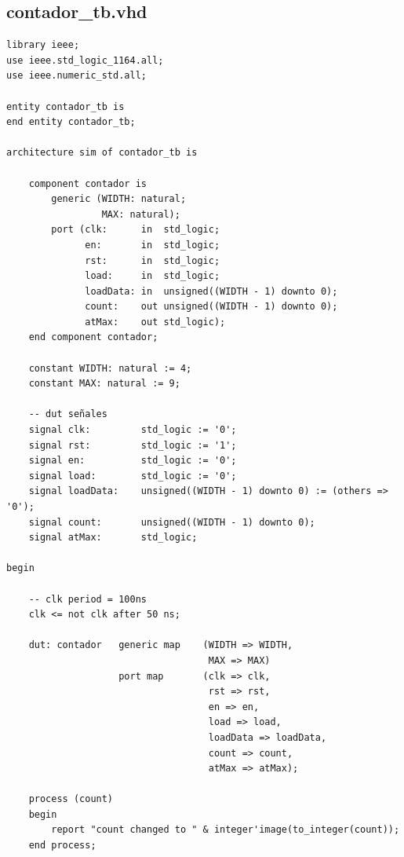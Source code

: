 \documentclass[a4paper]{article}
\begin{document}
\subsection{contador\_tb.vhd}
\begin{verbatim}
library ieee;
use ieee.std_logic_1164.all;
use ieee.numeric_std.all;

entity contador_tb is
end entity contador_tb;

architecture sim of contador_tb is

    component contador is
        generic (WIDTH: natural;
                 MAX: natural);
        port (clk:      in  std_logic;
              en:       in  std_logic;
              rst:      in  std_logic;
              load:     in  std_logic;
              loadData: in  unsigned((WIDTH - 1) downto 0);
              count:    out unsigned((WIDTH - 1) downto 0);
              atMax:    out std_logic);
    end component contador;

    constant WIDTH: natural := 4;
    constant MAX: natural := 9;

    -- dut señales
    signal clk:         std_logic := '0';
    signal rst:         std_logic := '1';
    signal en:          std_logic := '0';
    signal load:        std_logic := '0';
    signal loadData:    unsigned((WIDTH - 1) downto 0) := (others => '0');
    signal count:       unsigned((WIDTH - 1) downto 0);
    signal atMax:       std_logic;

begin

    -- clk period = 100ns
    clk <= not clk after 50 ns;

    dut: contador   generic map    (WIDTH => WIDTH,
                                    MAX => MAX)
                    port map       (clk => clk,
                                    rst => rst,
                                    en => en,
                                    load => load,
                                    loadData => loadData,
                                    count => count,
                                    atMax => atMax);

    process (count)
    begin
        report "count changed to " & integer'image(to_integer(count));
    end process;


\end{verbatim}
\end{document}
